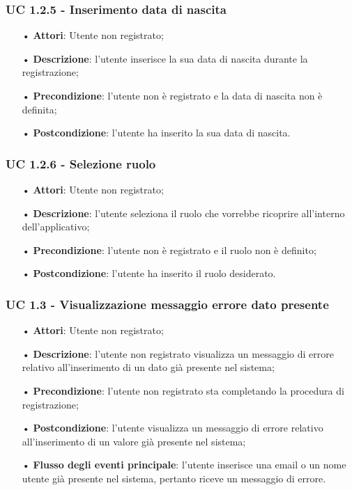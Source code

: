 \subsubsection{UC 1.2.5 - Inserimento data di nascita}
\begin{itemize}
	\item[•]\textbf{Attori}: Utente non registrato;
	\item[•]\textbf{Descrizione}: l'utente inserisce la sua data di nascita durante la registrazione;
	\item[•]\textbf{Precondizione}: l'utente non è registrato e la data di nascita non è definita;
	\item[•]\textbf{Postcondizione}: l'utente ha inserito la sua data di nascita.
\end{itemize}

\subsubsection{UC 1.2.6 - Selezione ruolo}
\begin{itemize}
	\item[•]\textbf{Attori}: Utente non registrato;
	\item[•]\textbf{Descrizione}: l'utente seleziona il ruolo che vorrebbe ricoprire all'interno dell'applicativo;
	\item[•]\textbf{Precondizione}: l'utente non è registrato e il ruolo non è definito;
	\item[•]\textbf{Postcondizione}: l'utente ha inserito il ruolo desiderato.
\end{itemize}

\subsubsection{UC 1.3 - Visualizzazione messaggio errore dato presente}
\begin{itemize}
	\item[•]\textbf{Attori}: Utente non registrato;
	\item[•]\textbf{Descrizione}: l'utente non registrato visualizza un messaggio di errore relativo all'inserimento
	di un dato già presente nel sistema;
	\item[•]\textbf{Precondizione}: l'utente non registrato sta completando la procedura di registrazione;
	\item[•]\textbf{Postcondizione}: l'utente visualizza un messaggio di errore relativo all'inserimento di un valore già presente nel sistema;
	\item[•]\textbf{Flusso degli eventi principale}: l'utente inserisce una email o un nome utente già presente nel sistema, pertanto riceve un messaggio di errore.
\end{itemize}

